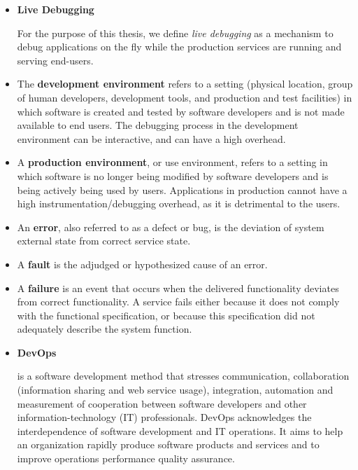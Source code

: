 \begin{itemize}
	
	\item \hypertarget{defn:livedebugging}{\textbf{Live Debugging}}
	For the purpose of this thesis, we define \emph{live debugging} as a mechanism to debug applications on the fly while the production services are running and serving end-users.
	
	\item The \hypertarget{defn:development-environment}{\textbf{development environment}} refers to a setting (physical location, group of human developers, development tools, and production and test facilities) in which software is created and tested by software developers and is not made available to end users.
	The debugging process in the development environment can be interactive, and can have a high overhead.
	
	\item A \hypertarget{defn:production-environment}{\textbf{production environment}}, or use environment, refers to a setting in which software is no longer being modified by software developers and is being actively being used by users.
	Applications in production cannot have a high instrumentation/debugging overhead, as it is detrimental to the users.
	
	\item An \hypertarget{defn:error}{\textbf{error}}, also referred to as a defect or bug, is the deviation of system external state from correct service state.
	
	\item A \hypertarget{defn:fault}{\textbf{fault}} is the adjudged or hypothesized cause of an error.
	
	\item A \hypertarget{defn:failure}{\textbf{failure}} is an event that occurs when the delivered functionality deviates from correct functionality.
	A service fails either because it does not comply with the functional specification, or because this specification did not adequately describe the system function.
	
	\item \hypertarget{defn:devops}{\textbf{DevOps}} is a software development method that stresses communication, collaboration (information sharing and web service usage), integration, automation and measurement of cooperation between software developers and other information-technology (IT) professionals.
	DevOps acknowledges the interdependence of software development and IT operations.
	It aims to help an organization rapidly produce software products and services and to improve operations performance quality assurance.
	

\end{itemize}
